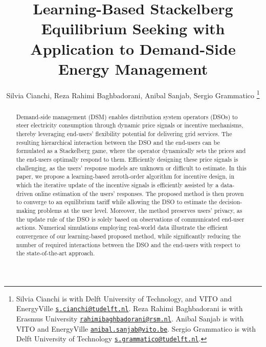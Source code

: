 \documentclass[letterpaper, 10 pt, conference]{ieeeconf}
\begin{document}
\title{\LARGE \bf  Learning-Based Stackelberg Equilibrium Seeking with Application to Demand-Side Energy Management}

\author{Silvia Cianchi, Reza Rahimi Baghbadorani, Anibal Sanjab, Sergio Grammatico \thanks{ Silvia Cianchi is with Delft University of Technology, and VITO and EnergyVille  \href{mailto:s.cianchi@tudelft.nl}{\texttt{s.cianchi@tudelft.nl}}. Reza Rahimi Baghbadorani is with Erasmus University \href{mailto:rahimibaghbadorani@rsm.nl}{\texttt{rahimibaghbadorani@rsm.nl}}. Anibal Sanjab is with VITO and EnergyVille \href{mailto:anibal.sanjab@vito.be}{\texttt{anibal.sanjab@vito.be}}. Sergio Grammatico is with Delft University of Technology \href{mailto:s.grammatico@tudelft.nl}{\texttt{s.grammatico@tudelft.nl}}.}}
\maketitle

\begin{abstract}
Demand-side management (DSM) enables distribution system operators (DSOs) to steer electricity consumption through dynamic price signals or incentive mechanisms, thereby leveraging end-users' flexibility potential for delivering grid services. The resulting hierarchical interaction between the DSO and the end-users can be formulated as a Stackelberg game, where the operator dynamically sets the prices and the end-users optimally respond to them. Efficiently designing these price signals is challenging, as the users’ response models are unknown or difficult to estimate. In this paper, we propose a learning-based zeroth-order algorithm for incentive design, in which the iterative update of the incentive signals is efficiently assisted by a data-driven online estimation of the users' responses. The proposed method is then proven to converge to an equilibrium tariff while allowing the DSO to estimate the decision-making problems at the user level. Moreover, the method preserves users' privacy, as the update rule of the DSO is solely based on observations of communicated end-user actions. Numerical simulations employing real-world data illustrate the efficient convergence of our learning-based proposed method, while significantly reducing the number of required interactions between the DSO and the end-users with respect to the state-of-the-art approach.
\end{abstract}
\end{document}
